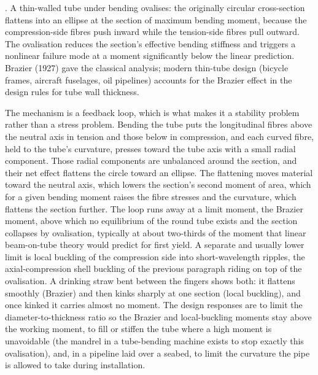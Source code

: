 . A thin-walled tube under bending
ovalises: the originally circular cross-section flattens into an
ellipse at the section of maximum bending moment, because the
compression-side fibres push inward while the tension-side fibres
pull outward. The ovalisation reduces the section's effective
bending stiffness and triggers a nonlinear failure mode at a moment
significantly below the linear prediction. Brazier (1927) gave the
classical analysis; modern thin-tube design (bicycle frames, aircraft
fuselages, oil pipelines) accounts for the Brazier effect in the
design rules for tube wall thickness.

The mechanism is a feedback loop, which is what makes it a stability
problem rather than a stress problem. Bending the tube puts the longitudinal
fibres above the neutral axis in tension and those below in compression, and
each curved fibre, held to the tube's curvature, presses toward the tube
axis with a small radial component. Those radial components are unbalanced
around the section, and their net effect flattens the circle toward an
ellipse. The flattening moves material toward the neutral axis, which
lowers the section's second moment of area, which for a given bending moment
raises the fibre stresses and the curvature, which flattens the section
further. The loop runs away at a limit moment, the Brazier moment, above
which no equilibrium of the round tube exists and the section collapses by
ovalisation, typically at about two-thirds of the moment that linear
beam-on-tube theory would predict for first yield. A separate and usually
lower limit is local buckling of the compression side into short-wavelength
ripples, the axial-compression shell buckling of the previous paragraph
riding on top of the ovalisation. A drinking straw bent between the fingers
shows both: it flattens smoothly (Brazier) and then kinks sharply at one
section (local buckling), and once kinked it carries almost no moment. The
design responses are to limit the diameter-to-thickness ratio so the Brazier
and local-buckling moments stay above the working moment, to fill or
stiffen the tube where a high moment is unavoidable (the mandrel in a
tube-bending machine exists to stop exactly this ovalisation), and, in a
pipeline laid over a seabed, to limit the curvature the pipe is allowed to
take during installation.

